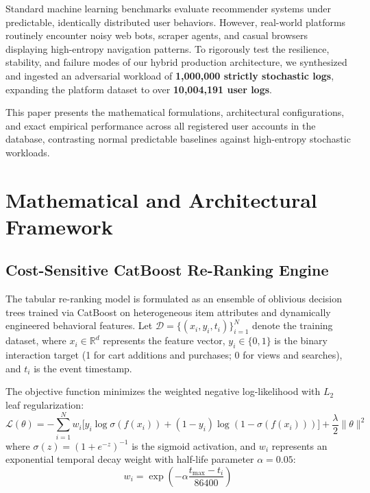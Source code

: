 \documentclass[11pt,a4paper]{article}
\begin{document}
Standard machine learning benchmarks evaluate recommender systems under predictable, identically distributed user behaviors. However, real-world platforms routinely encounter noisy web bots, scraper agents, and casual browsers displaying high-entropy navigation patterns. To rigorously test the resilience, stability, and failure modes of our hybrid production architecture, we synthesized and ingested an adversarial workload of \textbf{1,000,000 strictly stochastic logs}, expanding the platform dataset to over \textbf{10,004,191 user logs}.

This paper presents the mathematical formulations, architectural configurations, and exact empirical performance across all registered user accounts in the database, contrasting normal predictable baselines against high-entropy stochastic workloads.

\section{Mathematical and Architectural Framework}

\subsection{Cost-Sensitive CatBoost Re-Ranking Engine}
The tabular re-ranking model is formulated as an ensemble of oblivious decision trees trained via CatBoost on heterogeneous item attributes and dynamically engineered behavioral features. Let $\mathcal{D} = \{(x_i, y_i, t_i)\}_{i=1}^N$ denote the training dataset, where $x_i \in \mathbb{R}^d$ represents the feature vector, $y_i \in \{0, 1\}$ is the binary interaction target (1 for cart additions and purchases; 0 for views and searches), and $t_i$ is the event timestamp.

The objective function minimizes the weighted negative log-likelihood with $L_2$ leaf regularization:
\begin{equation}
    \mathcal{L}(\theta) = -\sum_{i=1}^N w_i \Big[ y_i \log \sigma(f(x_i)) + (1 - y_i) \log(1 - \sigma(f(x_i))) \Big] + \frac{\lambda}{2} \|\theta\|^2
\end{equation}
where $\sigma(z) = (1 + e^{-z})^{-1}$ is the sigmoid activation, and $w_i$ represents an exponential temporal decay weight with half-life parameter $\alpha = 0.05$:
\begin{equation}
    w_i = \exp\left(-\alpha \frac{t_{\text{max}} - t_i}{86400}\right)
\end{equation}
\end{document}
